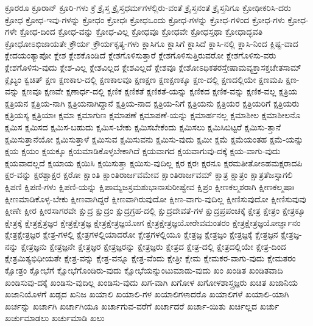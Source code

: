 {ಕ್ರೂರರೂ
ಕ್ರೂರಾನ್
ಕ್ರೂರಿ-ಗಳು
ಕ್ರೆ
ಕ್ರೈಸ್ತ
ಕ್ರೈಸ್ತಧರ್ಮಗಳಲ್ಲಿರು-ವಂತೆ
ಕ್ರೈಸ್ತನಂತೆ
ಕ್ರೈಸ್ತನಿಗೂ
ಕ್ರೋಢೀಕರಿಸಿ-ದರು
ಕ್ರೋಧ
ಕ್ರೋಧ-ಇವು-ಗಳನ್ನು
ಕ್ರೋಧಂ
ಕ್ರೋಧಃ
ಕ್ರೋಧಒಂದು
ಕ್ರೋಧ-ಗಳನ್ನು
ಕ್ರೋಧ-ಗಳಿಂದ
ಕ್ರೋಧ-ಗಳು
ಕ್ರೋಧ-ಗಳೇ
ಕ್ರೋಧ-ದಿಂದ
ಕ್ರೋಧ-ವನ್ನು
ಕ್ರೋಧ-ವಿಲ್ಲ
ಕ್ರೋಧವೂ
ಕ್ರೋಧವೇ
ಕ್ರೋಧಸ್ತಥಾ
ಕ್ರೋಧಾದ್ಭವತಿ
ಕ್ರೋಧೋಽಭಿಜಾಯತೇ
ಕ್ರೌರ್ಯ
ಕ್ರೌರ್ಯಕೃತ್ಯ-ಗಳು
ಕ್ಲಾಸಿಗೂ
ಕ್ಲಾಸಿಗೆ
ಕ್ಲಾಸಿದೆ
ಕ್ಲಾಸಿ-ನಲ್ಲಿ
ಕ್ಲಾಸಿ-ನಿಂದ
ಕ್ಲಿಷ್ಟ-ವಾದ
ಕ್ಲೇದಯಂತ್ಯಾಪೋ
ಕ್ಲೇಶ
ಕ್ಲೇಶಕೊಂಡಿದೆ
ಕ್ಲೇಶಗೊಳಿಸುತ್ತಾರೆ
ಕ್ಲೇಶಗೊಳಿಸುತ್ತಿರುವರೋ
ಕ್ಲೇಶಗೊಳಿಸು-ವರು
ಕ್ಲೇಶಗೊಳಿಸು-ವುದು
ಕ್ಲೇಶ-ವಿಲ್ಲ
ಕ್ಲೇಶವಿಲ್ಲದ
ಕ್ಲೇಶವಿಲ್ಲದೆ
ಕ್ಲೇಶವೂ
ಕ್ಲೇಶೋಽಧಿಕತರಸ್ತೇಷಾಮವ್ಯಕ್ತಾಸಕ್ತಚೇತಸಾಮ್
ಕ್ಲೈಬ್ಯಂ
ಕ್ವಚಿತ್
ಕ್ಷಣ
ಕ್ಷಣಕಾಲ-ದಲ್ಲಿ
ಕ್ಷಣಕಾಲವೂ
ಕ್ಷಣಕ್ಷಣ
ಕ್ಷಣಕ್ಷಣಕ್ಕೂ
ಕ್ಷಣ-ದಲ್ಲಿ
ಕ್ಷಣದಲ್ಲಿಯೇ
ಕ್ಷಣಮಪಿ
ಕ್ಷಣ-ವನ್ನು
ಕ್ಷಣವೂ
ಕ್ಷಣವೇ
ಕ್ಷಣಾರ್ಧ-ದಲ್ಲಿ
ಕ್ಷಣಿಕ
ಕ್ಷಣಿಕತೆ
ಕ್ಷಣಿಕತೆ-ಯನ್ನು
ಕ್ಷಣಿಕದ
ಕ್ಷಣಿಕ-ವನ್ನು
ಕ್ಷಣಿಕ-ವಲ್ಲ
ಕ್ಷತ್ರಿಯ
ಕ್ಷತ್ರಿಯನ
ಕ್ಷತ್ರಿಯ-ನಾಗಿ
ಕ್ಷತ್ರಿಯನಾಗಿದ್ದಾನೆ
ಕ್ಷತ್ರಿಯ-ನಾದ
ಕ್ಷತ್ರಿಯ-ನಿಗೆ
ಕ್ಷತ್ರಿಯನು
ಕ್ಷತ್ರಿಯರ
ಕ್ಷತ್ರಿಯರಿಗೆ
ಕ್ಷತ್ರಿಯರು
ಕ್ಷತ್ರಿಯಸ್ಯ
ಕ್ಷತ್ರಿಯಾಃ
ಕ್ಷಮಾ
ಕ್ಷಮಾಗುಣ
ಕ್ಷಮಾಪಣೆ
ಕ್ಷಮಾಪಣೆ-ಯನ್ನು
ಕ್ಷಮಾರ್ಹನಲ್ಲ
ಕ್ಷಮಾಶೀಲ
ಕ್ಷಮಾಶೀಲನೊ
ಕ್ಷಮಿಸ
ಕ್ಷಮಿಸದ
ಕ್ಷಮಿಸ-ಬಹುದು
ಕ್ಷಮಿಸ-ಬೇಕು
ಕ್ಷಮಿಸಬೇಕೆಂದು
ಕ್ಷಮಿಸಲು
ಕ್ಷಮಿಸಿಬಿಟ್ಟರೆ
ಕ್ಷಮಿಸು-ತ್ತಾನೆ
ಕ್ಷಮಿಸುತ್ತಾನೆಯೋ
ಕ್ಷಮಿಸುತ್ತಾಳೆ
ಕ್ಷಮಿಸುವ
ಕ್ಷಮಿಸುವನು
ಕ್ಷಮಿಸು-ವುದು
ಕ್ಷಮೀ
ಕ್ಷಮೆ
ಕ್ಷಮೆಯಂತಹ
ಕ್ಷಮೆ-ಯನ್ನು
ಕ್ಷಯ
ಕ್ಷಯಂ
ಕ್ಷಯಕ್ಕೂ
ಕ್ಷಯಮಾಡಿಕೊಳ್ಳಬೇಕಾಗಿದೆ
ಕ್ಷಯವಾಗದ
ಕ್ಷಯವಾಗುವು-ದಕ್ಕೆ
ಕ್ಷಯ-ವಾಗು-ವುದು
ಕ್ಷಯವಾದಲ್ಲದೆ
ಕ್ಷಯಾಯ
ಕ್ಷಯಿಸಿ
ಕ್ಷಯಿಸುತ್ತಾ
ಕ್ಷಯಿಸು-ವುದಿಲ್ಲ
ಕ್ಷರ
ಕ್ಷರಃ
ಕ್ಷರನೂ
ಕ್ಷರಮತೀತೋಽಹಮಕ್ಷರಾದಪಿ
ಕ್ಷರ-ವನ್ನು
ಕ್ಷರಶ್ಚಾಕ್ಷರ
ಕ್ಷರೋ
ಕ್ಷಾಂತಿ
ಕ್ಷಾಂತಿರಾರ್ಜವಮೇವ
ಕ್ಷಾಂತಿರಾರ್ಜವಮ್
ಕ್ಷಾತ್ರ
ಕ್ಷಾತ್ರಂ
ಕ್ಷಾತ್ರತೆಜಸ್ಸಾಗಲಿ
ಕ್ಷಿಪಣಿ
ಕ್ಷಿಪಣಿ-ಗಳು
ಕ್ಷಿಪಣಿ-ಯನ್ನು
ಕ್ಷಿಪಾಮ್ಯಜಸ್ರಮಶುಭಾನಾಸುರೀಷ್ವೇವ
ಕ್ಷಿಪ್ರಂ
ಕ್ಷೀಣಕಲ್ಮಶರಾಗಿ
ಕ್ಷೀಣಕಲ್ಮಷಾಃ
ಕ್ಷೀಣಮಾಡಿಕೊಳ್ಳ-ಬೇಕು
ಕ್ಷೀಣವಾಗಿದ್ದರೆ
ಕ್ಷೀಣವಾಗಿರುವುದೋ
ಕ್ಷೀಣ-ವಾಗು-ವುದಿಲ್ಲ
ಕ್ಷೀಣಿಸುವುದೋ
ಕ್ಷೀಣಿಸುವುವು
ಕ್ಷೀಣೇ
ಕ್ಷೀರ
ಕ್ಷೀರಸಾಗರವೇ
ಕ್ಷುದ್ರ
ಕ್ಷುದ್ರಂ
ಕ್ಷುದ್ರಗ್ರಹ-ದಲ್ಲಿ
ಕ್ಷುದ್ರದೇವತೆ-ಗಳ
ಕ್ಷುದ್ರಪ್ರಪಂಚಕ್ಕೆ
ಕ್ಷೇತ್ರ
ಕ್ಷೇತ್ರಂ
ಕ್ಷೇತ್ರಕ್ಕೂ
ಕ್ಷೇತ್ರಕ್ಕೆ
ಕ್ಷೇತ್ರಕ್ಷೆತ್ರಜ್ಞರ
ಕ್ಷೇತ್ರಕ್ಷೇತ್ರಜ್ಞ
ಕ್ಷೇತ್ರಕ್ಷೇತ್ರಜ್ಞಯೋಗ
ಕ್ಷೇತ್ರಕ್ಷೇತ್ರಜ್ಞಯೋರೇವಮಂತರಂ
ಕ್ಷೇತ್ರಕ್ಷೇತ್ರಜ್ಞಯೋರ್ಜ್ಞಾನಂ
ಕ್ಷೇತ್ರಕ್ಷೇತ್ರಜ್ಞರ
ಕ್ಷೇತ್ರ-ಗಳಲ್ಲಿ
ಕ್ಷೇತ್ರಗಳಲ್ಲಿಯಾದರೋ
ಕ್ಷೇತ್ರಗಳಲ್ಲಿಯೂ
ಕ್ಷೇತ್ರಜ್ಞ
ಕ್ಷೇತ್ರಜ್ಞಂ
ಕ್ಷೇತ್ರಜ್ಞಕ್ಕೆ
ಕ್ಷೇತ್ರಜ್ಞನ
ಕ್ಷೇತ್ರಜ್ಞ-ನನ್ನು
ಕ್ಷೇತ್ರಜ್ಞನು
ಕ್ಷೇತ್ರಜ್ಞನೇ
ಕ್ಷೇತ್ರಜ್ಞರ
ಕ್ಷೇತ್ರಜ್ಞರನ್ನು
ಕ್ಷೇತ್ರಜ್ಞರು
ಕ್ಷೇತ್ರದ
ಕ್ಷೇತ್ರ-ದಲ್ಲಿ
ಕ್ಷೇತ್ರದಲ್ಲಿಯೇ
ಕ್ಷೇತ್ರ-ದಿಂದ
ಕ್ಷೇತ್ರಮಿತ್ಯಭಿಧೀಯತೇ
ಕ್ಷೇತ್ರ-ವನ್ನು
ಕ್ಷೇತ್ರ-ವನ್ನೂ
ಕ್ಷೇತ್ರ-ವೆಂದು
ಕ್ಷೇತ್ರೀ
ಕ್ಷೇಮ
ಕ್ಷೇಮಕರ-ವಾಗು-ವುದು
ಕ್ಷೇಮತರಂ
ಕ್ಷೋತ್ರಂ
ಕ್ಷೋಭೆಗೆ
ಕ್ಷೋಭೆಗೊಂಡಿರು-ವುದು
ಕ್ಷೋಭೆಯನ್ನುಂಟುಮಾಡು-ವುದು
ಖಂ
ಖಂಡಿತ
ಖಂಡಿತವಾದಿ
ಖಂಡಿಸುವು-ದಕ್ಕೆ
ಖಂಡಿಸು-ವುದಿಲ್ಲ
ಖಂಡಿಸು-ವುದು
ಖಗ-ವಾಗಿ
ಖಗೋಳ
ಖಗೋಳಶಾಸ್ತ್ರಜ್ಞರು
ಖಚಿತ
ಖಜಾನಿಯ
ಖಜಾನಿಯೊಳಗೆ
ಖಡ್ಗದ
ಖನಿಜ
ಖಯಾಲಿ
ಖಯಾಲಿ-ಗಳ
ಖಯಾಲಿಗಳಾದರೊ
ಖಯಾಲಿಗಳೆ
ಖಯಾಲಿ-ಯಾಗಿ
ಖರ್ಚನ್ನು
ಖರ್ಚಾಗಿ
ಖರ್ಚಾಗಿಯೂ
ಖರ್ಚಾಗುವ-ವರೆಗೆ
ಖರ್ಚಾದರೆ
ಖರ್ಚಾ-ಯಿತು
ಖರ್ಚಿಲ್ಲದ
ಖರ್ಚು
ಖರ್ಚುಮಾಡಲು
ಖರ್ಚುಮಾಡಿ
ಖಲು
}
